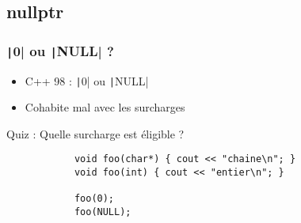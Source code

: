 \documentclass[C++.tex]{subfiles}
\begin{document}
\subsection*{nullptr}
\begin{frame}[fragile]
	\frametitle{\texttt|0| ou \texttt|NULL| ?}
	\begin{itemize}
		\item C++ 98 : \texttt|0| ou \texttt|NULL|


		\item Cohabite mal avec les surcharges
	\end{itemize}


	\begin{block}{Quiz : Quelle surcharge est éligible ?}
		\begin{verbatim}
			void foo(char*) { cout << "chaine\n"; }
			void foo(int) { cout << "entier\n"; }

			foo(0);
			foo(NULL);
		\end{verbatim}
	\end{block}
\end{frame}
\end{document}
